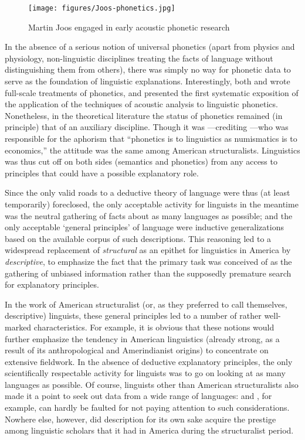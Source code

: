 \begin{wrapfigure}[11]{r}{.4\textwidth}
  \texttt{[image: figures/Joos-phonetics.jpg]}
  \caption{Martin Joos engaged in early acoustic phonetic research}
  \label{fig:ch.structuralists.joos-phonetics}
\end{wrapfigure}
In the absence of a serious notion of universal phonetics (apart from
physics and physiology, non-linguistic disciplines treating the facts
of language without distinguishing them from others), there was simply
no way for phonetic data to serve as the foundation of linguistic
explanations. Interestingly, both \citet{pike43:phonetics} and
\citet{hockett55:manual} wrote full-scale treatments of phonetics, and
\citet{joos48:acoustics} presented the first systematic exposition of
the application of the techniques of acoustic analysis to linguistic
phonetics. Nonetheless, in the theoretical literature the status of
phonetics remained (in principle) that of an auxiliary
discipline. Though it was \citet{trubetzkoy39:grundzuge}---crediting
{\Jakobson}---who was responsible for the aphorism that ``phonetics is to
linguistics as numismatics is to economics,'' the attitude was the same
among American structuralists. Linguistics was thus cut off on both
sides (semantics and phonetics) from any access to principles that
could have a possible explanatory role.

Since the only valid roads to a deductive theory of language were thus
(at least temporarily) foreclosed, the only acceptable activity for
linguists in the meantime was the neutral gathering of facts about as
many languages as possible; and the only acceptable `general
principles' of language were inductive generalizations based on the
available corpus of such descriptions. This reasoning led to a
widespread replacement of \emph{structural} as an epithet for
linguistics in America by \emph{descriptive}, to emphasize the fact
that the primary task was conceived of as the gathering of unbiased
information rather than the supposedly premature search for
explanatory principles.

In the work of American structuralist (or, as they preferred to call
themselves, descriptive) linguists, these general principles led to a
number of rather well-marked characteristics. For example, it is
obvious that these notions would further emphasize the tendency in
American linguistics (already strong, as a result of its
anthropological and Amerindianist origins) to concentrate on extensive
fieldwork. In the absence of deductive explanatory principles, the
only scientifically respectable activity for linguists was to go on
looking at as many languages as possible. Of course, linguists other
than American structuralists also made it a point to seek out data
from a wide range of languages: {\Trubetzkoy} and {\Jakobson}, for example,
can hardly be faulted for not paying attention to such
considerations. Nowhere else, however, did description for its own
sake acquire the prestige among linguistic scholars that it had in
America during the structuralist period.

